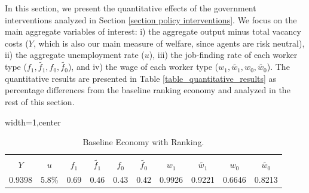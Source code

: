 \documentclass[12pt]{article} %
\theoremstyle{definition}
\begin{document}
In this section, we present the quantitative effects of the government interventions analyzed in Section \ref{section policy interventions}.
We focus on the main aggregate variables of interest: i) the aggregate output minus total vacancy costs ($Y$, which is also our main measure of welfare, since agents are risk neutral), ii) the aggregate unemployment rate ($u$), iii) the job-finding rate of each worker type ($f_{1}, \tilde{f_{1}}, f_{0}, \tilde{f_{0}}$), and iv) the wage of each worker type ($w_{1}, \tilde{w_{1}}, w_{0}, \tilde{w_{0}}$).
The quantitative results are presented in Table \ref{table_quantitative_results} as percentage differences from the baseline ranking economy and analyzed in the rest of this section.

\begin{table}[h!]

\begin{adjustbox}{width=1\columnwidth,center}

 \begin{tabular}{||c c c c c c c c c c||} 
 \hline 
 \\[-1.1em]
 \textbf{$Y$} & \textbf{$u$} & \textbf{$f_{1}$} & \textbf{$\tilde{f_1}$} & \textbf{$f_{0}$} & \textbf{$\tilde{f_0}$} & \textbf{$w_{1}$} & \textbf{$\tilde{w_1}$} & \textbf{$w_{0}$} & \textbf{$\tilde{w_0}$}   \\  
 \hline\hline
  0.9398 & 5.8\% & 0.69 & 0.46 & 0.43 & 0.42 & 0.9926  & 0.9221  & 0.6646  &  0.8213 \\ [1ex] 
 \hline
 \end{tabular}
\end{adjustbox}
\centering
\caption{Baseline Economy with Ranking.} \label{table_baseline_economy}
\end{table} 
\end{document}
